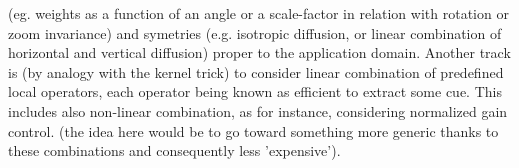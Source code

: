 \documentclass[twocolumn]{article}
\begin{document}
 (eg. weights as a function of an angle or a scale-factor in relation with rotation or zoom invariance) and symetries (e.g. isotropic diffusion, or linear combination of horizontal and vertical diffusion) proper to the application domain. 
Another track is (by analogy with the kernel trick) to consider linear combination of predefined local operators, each operator being known as efficient to extract some cue. This includes also non-linear combination, as for instance, considering normalized gain control. (the idea here would be to go toward something more generic thanks to these combinations and consequently less 'expensive'). 
\end{document}
